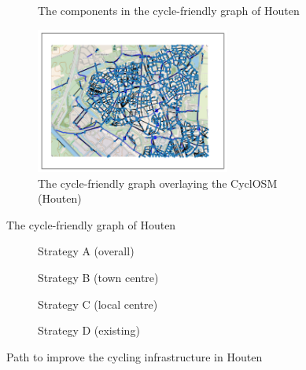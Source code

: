 \documentclass[12pt,a4paper]{report}
\begin{document}
\begin{figure}[ht!]
    \begin{subfigure}{\textwidth}
        \centering
         {
            
        }
        \caption{The components in the cycle-friendly graph of Houten}
        \label{fig:components houten}
    \end{subfigure}
    \hfill
    \begin{subfigure}{\textwidth}
        \centering
        \includegraphics[width=0.7\textwidth,trim={1cm 1cm 1cm 1cm},clip]{diss_images/eval/overlay_houten.png}
        \caption{The cycle-friendly graph overlaying the CyclOSM (Houten)}
        \label{fig:overlay houten}
    \end{subfigure}
    \caption{The cycle-friendly graph of Houten}
\end{figure}

\begin{figure}[ht]
    \centering
    \begin{subfigure}[ht]{0.47\textwidth}
        \centering
        
        \caption{Strategy A (overall)}
        \label{fig:overall houten}
    \end{subfigure}
    \hfill
    \begin{subfigure}[ht]{0.47\textwidth}
        \centering
        
        \caption{Strategy B (town centre)}
        \label{fig:centre houten}
    \end{subfigure}
    \hfill
    \begin{subfigure}[ht]{0.47\textwidth}
        \centering
        
        \caption{Strategy C (local centre)}
        \label{fig:local houten}
    \end{subfigure}
    \hfill
    \begin{subfigure}[ht]{0.47\textwidth}
        \centering
        
        \caption{Strategy D (existing)}
        \label{fig:existing houten}
    \end{subfigure}
       \caption{Path to improve the cycling infrastructure in Houten}
       \label{fig:path houten}
\end{figure}
\end{document}
